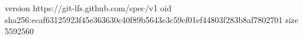 version https://git-lfs.github.com/spec/v1
oid sha256:ecaf63125923f45e363630c40f89b5643e3c59ef01ef44803f283b8af7802701
size 5592560
